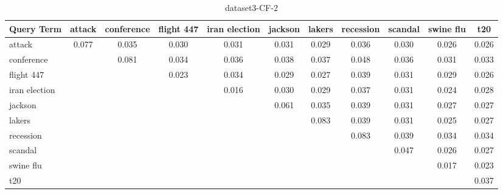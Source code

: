 \documentclass{sig-alternate}
\begin{document}
\begin{table}[!ht]
\centering
\resizebox{14cm}{!} 
{
	\begin{tabular}{|l|c|c|c|c|c|c|c|c|c|c|}
	\hline
	Query Term & attack & conference & flight 447 & iran election & jackson & lakers & recession & scandal & swine flu & t20\\
	\hline
	attack & 0.077 & 0.035 & 0.030 & 0.031 & 0.031 & 0.029 & 0.036 & 0.030 & 0.026 & 0.026\\
	\hline	
conference & 	 & 0.081 & 0.034 & 0.036 & 0.038 & 0.037 & 0.048 & 0.036 & 0.031 & 0.033\\
	 	\hline
flight 447	  &  &  & 0.023 & 0.034 & 0.029 & 0.027 & 0.039 & 0.031 & 0.029 & 0.026\\
	  	\hline
iran election	   &  &  &  & 0.016 & 0.030 & 0.029 & 0.037 & 0.031 & 0.024 & 0.028 \\
	   	\hline
jackson	  &  &  &  &   & 0.061 & 0.035 & 0.039 & 0.031 & 0.027 & 0.027\\
	   	\hline
lakers	  &  &  &  &  &    & 0.083 & 0.039 & 0.031 & 0.025 & 0.027\\
	    	\hline
	  recession  &  &  &  &  &  &   & 0.083 & 0.039 & 0.034 & 0.034\\
	     	\hline
scandal	 &  &  &  &  &  &  &       & 0.047 & 0.026 & 0.027\\
	      	\hline
swine flu	       &  &  &  &  &  &  &  &  & 0.017 & 0.023\\
	       \hline
t20	     &  &  &  &  &  &  &  &  &    & 0.037\\
	\hline
	\end{tabular}
}
\caption{dataset3-CF-2}\label{cf5}
\end{table}
\end{document}

